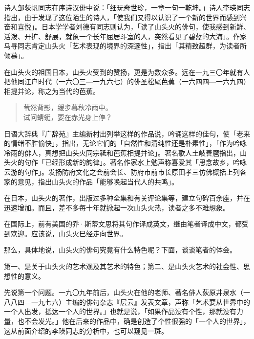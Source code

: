 {    诗人邹荻帆同志在序诗汉俳中说：「细玩奇世珍，一章一句一乾坤。」诗人李瑛同志指出，由于发现了这位陌生的诗人，「使我们又得以认识了一个新的世界而感到兴奋和喜悦」。日本学学者刘德有同志则认为，「读了山头火的俳句，使我感到新鲜、活泼、开扩、舒展，就象一个长年屈居斗室的人，突然看见了碧蓝的大海」。作家马寻同志肯定山头火「艺术表现的境界的深邃性」，指出「其精致超群，为读者所倾慕」。

    在山头火的祖国日本，山头火受到的赞扬，更是为数众多。远在一九三〇年就有人把他同江户时代（一六〇三—一九六七）的俳圣松尾芭蕉（一六四四—一六九四）相提并论，称之为当代的芭蕉。
    \begin{quote}
        茕然背影，缓步暮秋冷雨中。\\
        试问蜻蜓，要在赤光身上停？
    \end{quote}

    日语大辞典『广辞苑』主编新村出列举这样的作品说，吟诵这样的佳句，使「老来的情绪不胜愉快」，指出，无论它们的「自然性和清纯性还是朴素性」，「作为吟咏冷雨的俳人，真想把山头火同宗祗\footnotemark[1]和芭蕉相提并论」。著名歌人土岐善麿指出，山头火的句作「已经形成新的韵律」。著名作家水上勉声称喜爱其「思念故乡，吟咏云游的句作」。发扬防府文化之会前会长、防府市前市长原田孝三仿佛概括上列各家的意见，指出山头火的作品「能够唤起当代人的共鸣」。


    在日本，山头火的著作，出版过多种全集和有关评论集等，建立句碑百余座，并在迅速增加。而且，差不多每十年就掀起一次山头火热，读者之多不难想象。

    在国际上，前有美国的乔·斯蒂文思将其句作译成英文，继由笔者译成中文，都受到欢迎。应该说，山头火巳经走向世界。

    那么，具体地说，山头火的俳句究竟有什么特色呢？下面，谈谈笔者的体会。

    第一、是关于山头火的艺术观及其艺术的特色；第二、是山头火艺术的社会性、思想性的意义。

    先说第一个问题。一九〇九年前后，山头火在他的老师、著名俳人荻原井泉水（一八八四—一九七六）主编的俳句杂志『层云』发表文章，声称「艺术要从世界中的一个人出发，抵达一个人的世界。」\footnotemark[2]也就是说，「如果作品没有个性，那就没有力量，也不会发光。」\footnotemark[3]他在后来的作品中，确是创造了个性很强的「一个人的世界」，这从前面介绍的李瑛同志的分析中，也可以窥见一斑。


}

